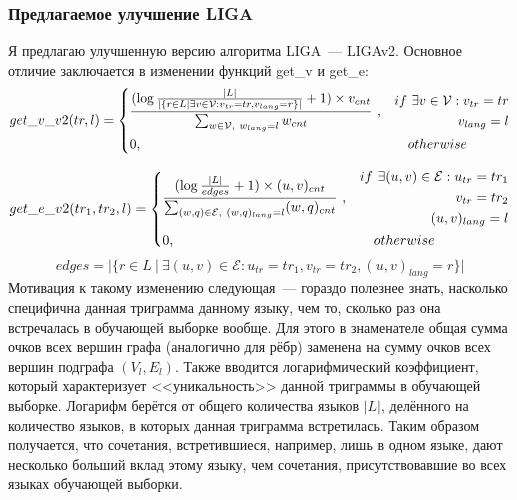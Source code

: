 \documentclass[a4paper, 14pt]{article}
\begin{document}
			\subsubsection{Предлагаемое улучшение LIGA}
			Я предлагаю улучшенную версию алгоритма LIGA~--- LIGAv2. Основное отличие заключается в изменении функций get\_v и get\_e:
			\[
 			get\_v\_v2(tr, l) =
 			  \begin{dcases}
  			   \frac{{(\log{|L| \over |\{r \in L | \exists v \in \mathcal{V}: v_{tr}=tr, v_{lang}=r\}|} + 1) \times  v_{cnt}}} 
  			   {\sum_{w \in \mathcal{V},\ w_{lang}=l} w_{cnt}} \ , & 
  			   \begin{split} 
						 if \ \exists v \in \mathcal{V}: v_{tr}=tr \\ v_{lang}=l	
  			   	\end{split} \\
  			   0, & \quad otherwise
  			 \end{dcases}
			\]		
		
			\[
 			get\_e\_v2(tr_1, tr_2, l) =
 			  \begin{dcases}
  			   \frac{{(\log{|L| \over edges} + 1) \times (u, v)_{cnt}}} 
  			   {\sum_{(w, q) \in \mathcal{E},\ (w, q)_{lang}=l} (w, q)_{cnt}} \ , & 
  			    \begin{split} 
						 if \ \exists (u, v) \in \mathcal{E}:  u_{tr}=tr_1 \\ v_{tr}=tr_2 \\ (u, v)_{lang}=l
  			   	\end{split} \\
  			   0, & \quad otherwise
  			 \end{dcases}
			\]	
			$$ edges = |\{r \in L \ | \ \exists (u, v) \in \mathcal{E}: u_{tr}=tr_1, v_{tr}=tr_2, (u, v)_{lang}=r\}| $$
			Мотивация к такому изменению следующая~--- гораздо полезнее знать, насколько специфична данная триграмма данному языку, чем то, сколько раз
			 она встречалась в обучающей выборке вообще. Для этого в знаменателе общая сумма очков всех вершин графа (аналогично для рёбр) заменена 
			на сумму очков всех вершин подграфа $(V_{l}, E_{l})$. Также вводится логарифмический коэффициент, который характеризует <<уникальность>> данной триграммы в обучающей выборке. Логарифм берётся от общего количества языков $|L|$, делённого на количество языков, в которых данная триграмма встретилась. Таким образом получается, что сочетания, встретившиеся, например, лишь в одном языке, дают несколько больший вклад этому языку, чем сочетания, присутствовавшие во всех языках обучающей выборки.
			
\end{document}
